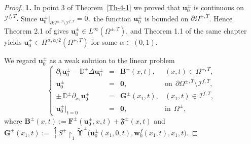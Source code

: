 \documentclass[reqno]{amsart}            %
\numberwithin{equation}{section}
\begin{document}
	
	\begin{proof} {\bf 1.} In point 3 of Theorem~\ref{Th-4-1} we proved that $\mathbf{u}_0^\pm$ is continuous on $\overline{\mathcal{I}^{f,T}}.$
		Since $\mathbf{u}_0^\pm|_{\partial\Omega^{\pm, T}  \setminus \mathcal{I}^{f,T}} =0,$ the function $\mathbf{u}_0^\pm$ is bounded on $\partial\Omega^{\pm,T}$. Hence Theorem 2.1 of \cite[Chapt.~V]{Lad_Sol_Ura_1968} gives $\mathbf{u}_0^\pm\in L^\infty(\Omega^{\pm,T})$, and Theorem 1.1 of the same chapter yields
		$\mathbf{u}_0^\pm\in H^{\alpha,\alpha/2}(\Omega^{\pm,T})
		$
		for some $\alpha\in(0,1)$.
		
		We  regard $\mathbf{u}_0^\pm$ as a weak solution to the linear problem
		\begin{equation}\label{par-problem}
			\left\{\begin{array}{rcll}
				\partial_t \mathbf{u}^\pm_0 -   \mathbb{D}^\pm \Delta \mathbf{u}^\pm_0
				& = & \mathbf{B}^\pm(x, t),  & (x,t) \in \Omega^{\pm, T} ,
				\\[2mm]
				\mathbf{u}^\pm_0  & = & \mathbf{0}, & \text{on} \ \ \partial\Omega^{\pm, T}  \setminus \mathcal{I}^{f,T},
				\\[2mm]
				\pm\, \mathbb{D}^\pm \partial_{x_2} \mathbf{u}^\pm_0&=& \mathbf{G}^\pm(x_1, t), & (x_1, t) \in \mathcal{I}^{f,T},
				\\[2mm]
				\mathbf{u}^\pm_0 \big|_{t=0} & = & \mathbf{0}, & \text{in} \ \ \Omega^\pm  ,
			\end{array}\right.
		\end{equation}
		where
		$\mathbf{B}^\pm(x, t) := \mathbf{F}^\pm(\mathbf{u}^\pm_0, x, t) + \boldsymbol{\mathfrak{F}}^\pm(x,t)$ and
		$\mathbf{G}^\pm(x_1, t) := \upharpoonleft\!\! {S}^\pm\!\!\upharpoonright_1\widetilde{\boldsymbol{\Upsilon}}^\pm\big(\mathbf{u}^\pm_0(x_1,0,t), \mathbf{w}^f_0(x_1,t), x_1, t \big).$
		

\end{proof}
\end{document}
